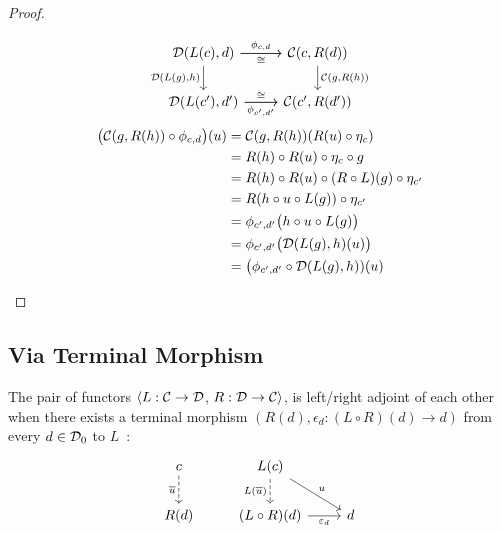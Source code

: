 \begin{theorem}
\begin{proof}
\begin{description}
        \[\begin{tikzcd}[ampersand replacement=\&]
          {\mathcal{D}(L(c), d)} \& {\mathcal{C}(c, R(d))} \\
          {\mathcal{D}(L(c'), d')} \& {\mathcal{C}(c', R(d'))}
          \arrow["{\phi_{c,d}}", from=1-1, to=1-2]
          \arrow["{\mathcal{D}(L(g),h)}"', from=1-1, to=2-1]
          \arrow["{\phi_{c',d'}}"', from=2-1, to=2-2]
          \arrow["{\mathcal{C}(g,R(h))}", from=1-2, to=2-2]
          \arrow["\cong"', from=1-1, to=1-2]
          \arrow["\cong", from=2-1, to=2-2]
        \end{tikzcd}\]
        \[
          \begin{aligned}
            \big(\mathcal{C}(g, R(h))\circ \phi_{c,d}\big)(u)
            &= \mathcal{C}(g, R(h))(R(u)\circ\eta_c)\\
            &= R(h)\circ R(u)\circ\eta_c \circ g\\
            &= R(h)\circ R(u) \circ (R\circ L)(g)\circ \eta_{c'}\\
            &= R(h\circ u\circ L(g))\circ \eta_{c'}\\
            &= \phi_{c', d'}\big(h\circ u \circ L(g)\big)\\
            &= \phi_{c', d'}\big(\mathcal{D}(L(g), h)(u)\big)\\
            &= \big(\phi_{c', d'}\circ \mathcal{D}(L(g), h))(u)
          \end{aligned}
        \]
    \end{description}
  \end{proof}
\end{theorem}

\subsection{Via Terminal Morphism}

\begin{definition}
  The pair of functors $\langle L: \mathcal{C}\to \mathcal{D}$, $R: \mathcal{D}\to \mathcal{C}\rangle$, is left/right adjoint
  of each other when there exists a terminal morphism $(R(d), \epsilon_d:
  (L\circ R)(d) \to d)$ from every $d\in \mathcal{D}_0$ to
  $L$~\parencite{awodey:category_theory}:
  \[\begin{tikzcd}[ampersand replacement=\&]
    c \& {L(c)} \\
    {R(d)} \& {(L\circ R)(d)} \& d
    \arrow["{\overline{u}}"', dashed, from=1-1, to=2-1]
    \arrow["{L(\overline{u})}"', dashed, from=1-2, to=2-2]
    \arrow["{\varepsilon_d}"', from=2-2, to=2-3]
    \arrow["u", from=1-2, to=2-3]
  \end{tikzcd}\]
\end{definition}

